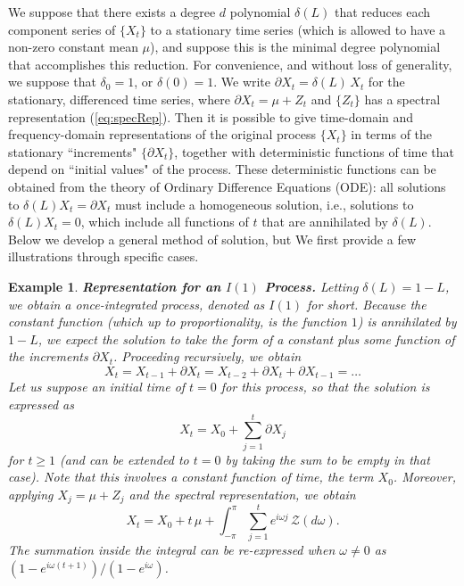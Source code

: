 \documentclass[a4paper]{book}
\newtheorem{Example}{Example}
\begin{document}
 We suppose that there exists a degree $d$ polynomial $\delta (L)$
  that reduces each component series of $\{ X_t \}$ to a stationary
   time series (which is allowed to have a non-zero constant mean $\mu$),
   and suppose this is the minimal degree polynomial that accomplishes
    this reduction.  For convenience, and without loss of generality,
    we suppose that $\delta_0 = 1$, or $\delta (0) = 1$.
    We write $\partial X_t = \delta (L) \, X_t$ for
  the stationary, differenced time series,
   where $\partial X_t = \mu + Z_t$ and $\{ Z_t \}$ has a spectral
    representation (\ref{eq:specRep}).  Then it is possible
   to give time-domain and frequency-domain representations of
    the original process $\{ X_t \}$ in terms of the stationary
  ``increments" $\{ \partial X_t \}$, together with deterministic functions
  of time that depend on ``initial values" of the process.
   These deterministic functions can be obtained from 
   the theory of Ordinary Difference Equations (ODE): 
  all solutions to   $\delta (L) X_t = \partial X_t$
   must include a homogeneous solution, i.e., solutions to
    $\delta (L) X_t = 0$,   which include all functions of 
    $t$ that are annihilated by $\delta (L)$.  Below we develop
  a general method of solution, but We first provide a few
   illustrations through specific cases.
 
 \begin{Example} {\bf Representation for an $I(1)$ Process.}  \rm
 \label{exam:I1-rep}
    Letting $\delta (L)= 1-L$, we obtain a once-integrated process,
  denoted as $I(1)$ for short.    
  Because  the constant function (which up to proportionality, is the function $1$)
  is annihilated by $1-L$, we expect the solution to take the form
   of a constant plus some function of the increments $\partial X_t$.
   Proceeding recursively, we obtain
\[
  X_t =    X_{t-1} + \partial X_t = X_{t-2} + \partial X_t + \partial X_{t-1} = \ldots
\]
    Let us suppose an initial time of $t=0$ for this process, so that the
      solution is expressed as 
\[
 X_t = X_0 + \sum_{j=1}^t \partial X_j
\]
    for $t \geq 1$ (and can be extended to $t=0$ by taking the sum to be empty in that case).
  Note that this involves a constant function of time,
  the term $X_0$.  Moreover, applying $X_j = \mu + Z_j$ and the spectral representation,
  we obtain
\begin{equation*}
 X_t = X_0 + t \, \mu +   \int_{-\pi}^{\pi} \sum_{j=1}^t e^{i \omega j}
   \, \mathcal{Z} (d\omega).  
\end{equation*}
  The summation inside the integral can be re-expressed when $\omega \neq 0$ as
  $(1 - e^{i \omega (t+1)})/(1-e^{i \omega})$.
\end{Example}   
\end{document}
